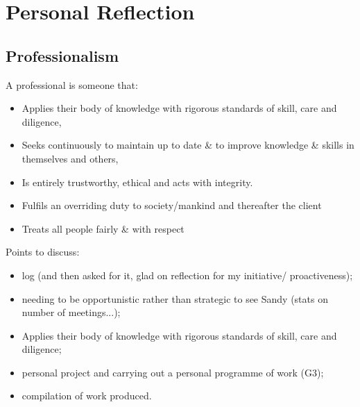\chapter{Personal Reflection} %

\label{Chapter4} %





\section{Professionalism}

A professional is someone that:
\begin{itemize}
    \item Applies their body of knowledge with rigorous standards of skill, care and diligence,
    \item Seeks continuously to maintain up to date \& to improve knowledge \& skills in themselves and others,
    \item Is entirely trustworthy, ethical and acts with integrity.
    \item Fulfils an overriding duty to society/mankind and thereafter the client 
    \item Treats all people fairly \& with respect 
\end{itemize}

Points to discuss:
\begin{itemize}
    \item log (and then asked for it, glad on reflection for my initiative/ proactiveness);
    \item needing to be opportunistic rather than strategic to see Sandy (stats on number of meetings...);
    \item Applies their body of knowledge with rigorous standards of skill, care and diligence;
    \item personal project and carrying out a personal programme of work (G3);
    \item compilation of work produced.
\end{itemize}


